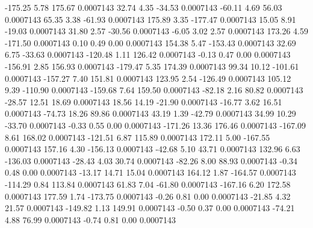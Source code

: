      -175.25        5.78      175.67     0.0007143
       32.74        4.35      -34.53     0.0007143
      -60.11        4.69       56.03     0.0007143
       65.35        3.38      -61.93     0.0007143
      175.89        3.35     -177.47     0.0007143
       15.05        8.91      -19.03     0.0007143
       31.80        2.57      -30.56     0.0007143
       -6.05        3.02        2.57     0.0007143
      173.26        4.59     -171.50     0.0007143
        0.10        0.49        0.00     0.0007143
      154.38        5.47     -153.43     0.0007143
       32.69        6.75      -33.63     0.0007143
     -120.48        1.11      126.42     0.0007143
       -0.13        0.47        0.00     0.0007143
     -156.91        2.85      156.93     0.0007143
     -179.47        5.35      174.39     0.0007143
       99.34       10.12     -101.61     0.0007143
     -157.27        7.40      151.81     0.0007143
      123.95        2.54     -126.49     0.0007143
      105.12        9.39     -110.90     0.0007143
     -159.68        7.64      159.50     0.0007143
      -82.18        2.16       80.82     0.0007143
      -28.57       12.51       18.69     0.0007143
       18.56       14.19      -21.90     0.0007143
      -16.77        3.62       16.51     0.0007143
      -74.73       18.26       89.86     0.0007143
       43.19        1.39      -42.79     0.0007143
       34.99       10.29      -33.70     0.0007143
       -0.33        0.55        0.00     0.0007143
     -171.26       13.36      176.46     0.0007143
     -167.09        8.61      168.02     0.0007143
     -121.51        6.87      115.89     0.0007143
      172.11        5.00     -167.55     0.0007143
      157.16        4.30     -156.13     0.0007143
      -42.68        5.10       43.71     0.0007143
      132.96        6.63     -136.03     0.0007143
      -28.43        4.03       30.74     0.0007143
      -82.26        8.00       88.93     0.0007143
       -0.34        0.48        0.00     0.0007143
      -13.17       14.71       15.04     0.0007143
      164.12        1.87     -164.57     0.0007143
     -114.29        0.84      113.84     0.0007143
       61.83        7.04      -61.80     0.0007143
     -167.16        6.20      172.58     0.0007143
      177.59        1.74     -173.75     0.0007143
       -0.26        0.81        0.00     0.0007143
      -21.85        4.32       21.57     0.0007143
     -149.82        1.13      149.91     0.0007143
       -0.50        0.37        0.00     0.0007143
      -74.21        4.88       76.99     0.0007143
       -0.74        0.81        0.00     0.0007143
